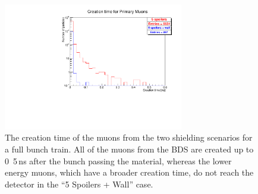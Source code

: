 \begin{figure}
    \centering
    \includegraphics[width=0.7\textwidth]{figures/muon_creationtime.pdf}
    \caption[Creation time of the muons]{
    The creation time of the muons from the two shielding scenarios for a full bunch train.
    All of the muons from the BDS are created up to \unit{0.5}\,{ns} after the bunch passing the material, whereas the lower energy muons, which have a broader creation time, do not reach the detector in the ``5 Spoilers + Wall'' case.
    }
    \label{fig:Creation_time}
\end{figure}

